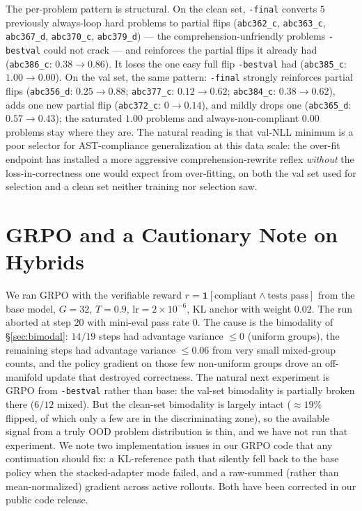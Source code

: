 \documentclass[11pt]{article}
\begin{document}
The per-problem pattern is structural. On the clean set, \texttt{-final} converts $5$ previously always-loop hard problems to partial flips (\texttt{abc362\_c}, \texttt{abc363\_c}, \texttt{abc367\_d}, \texttt{abc370\_c}, \texttt{abc379\_d}) --- the comprehension-unfriendly problems \texttt{-bestval} could not crack --- and reinforces the partial flips it already had (\texttt{abc386\_c}: $0.38\!\to\!0.86$). It loses the one easy full flip \texttt{-bestval} had (\texttt{abc385\_c}: $1.00\!\to\!0.00$). On the val set, the same pattern: \texttt{-final} strongly reinforces partial flips (\texttt{abc356\_d}: $0.25\!\to\!0.88$; \texttt{abc377\_c}: $0.12\!\to\!0.62$; \texttt{abc384\_c}: $0.38\!\to\!0.62$), adds one new partial flip (\texttt{abc372\_c}: $0\!\to\!0.14$), and mildly drops one (\texttt{abc365\_d}: $0.57\!\to\!0.43$); the saturated $1.00$ problems and always-non-compliant $0.00$ problems stay where they are. The natural reading is that val-NLL minimum is a poor selector for AST-compliance generalization at this data scale: the over-fit endpoint has installed a more aggressive comprehension-rewrite reflex \emph{without} the loss-in-correctness one would expect from over-fitting, on both the val set used for selection and a clean set neither training nor selection saw.

\section{GRPO and a Cautionary Note on Hybrids}
\label{sec:grpo}

We ran GRPO with the verifiable reward $r = \mathbf{1}[\text{compliant} \wedge \text{tests~pass}]$ from the base model, $G=32$, $T=0.9$, $\text{lr} = 2\!\times\!10^{-6}$, KL anchor with weight $0.02$. The run aborted at step $20$ with mini-eval pass rate $0$. The cause is the bimodality of \S\ref{sec:bimodal}: $14/19$ steps had advantage variance $\le 0$ (uniform groups), the remaining steps had advantage variance $\le 0.06$ from very small mixed-group counts, and the policy gradient on those few non-uniform groups drove an off-manifold update that destroyed correctness. The natural next experiment is GRPO from \texttt{-bestval} rather than base: the val-set bimodality is partially broken there ($6/12$ mixed). But the clean-set bimodality is largely intact ($\approx 19\%$ flipped, of which only a few are in the discriminating zone), so the available signal from a truly OOD problem distribution is thin, and we have not run that experiment. We note two implementation issues in our GRPO code that any continuation should fix: a KL-reference path that silently fell back to the base policy when the stacked-adapter mode failed, and a raw-summed (rather than mean-normalized) gradient across active rollouts. Both have been corrected in our public code release.
\end{document}
